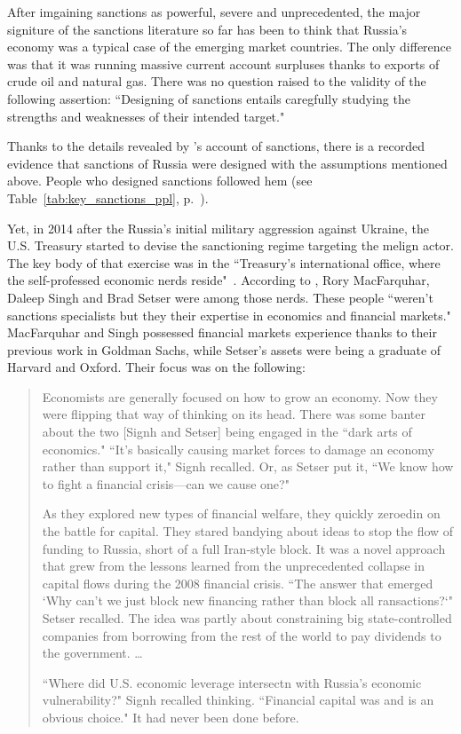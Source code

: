 After imgaining sanctions as powerful, severe and unprecedented, the major signiture of the sanctions literature so far has been to think that Russia's economy was a typical case of the emerging market countries. The only difference was that it was running massive current account surpluses thanks to exports of crude oil and natural gas. There was no question raised to the validity of the following assertion: ``Designing of sanctions entails caregfully studying the strengths and weaknesses of their intended target."~\citep[p.~23]{demarais2022}

Thanks to the details revealed by \cite{baker2024}'s account of sanctions, there is a recorded evidence that sanctions of Russia were designed with the assumptions mentioned above. People who designed sanctions followed hem (see Table~\ref{tab:key_sanctions_ppl}, p.~\pageref{tab:key_sanctions_ppl}). 

Yet, in 2014 after the Russia's initial military aggression against Ukraine, the U.S. Treasury started to devise the sanctioning regime targeting the melign actor. The key body of that exercise was in the ``Treasury's international office, where the self-professed economic nerds reside"~\citep[p.~86]{baker2024}. According to \citeauthor{baker2024}, Rory MacFarquhar, Daleep Singh and Brad Setser were among those nerds. These people ``weren't sanctions specialists but they their expertise in economics and financial markets." MacFarquhar and Singh possessed financial markets experience thanks to their previous work in Goldman Sachs, while Setser's assets were being a graduate of Harvard and Oxford. Their focus was on the following:

\begin{quote}
Economists are generally focused on how to grow an economy. Now they were flipping that way of thinking on its head. There was some banter about the two [Signh and Setser] being engaged in the ``dark arts of economics." ``It's basically causing market forces to damage an economy rather than support it," Signh recalled. Or, as Setser put it, ``We know how to fight a financial crisis---can we cause one?"\par As they explored new types of financial welfare, they quickly zeroedin on the battle for capital. They stared bandying about ideas to stop the flow of funding to Russia, short of a full Iran-style block. It was a novel approach that grew from the lessons learned from the unprecedented collapse in capital flows during the 2008 financial crisis. ``The answer that emerged `Why can't we just block new financing rather than block all ransactions?`" Setser recalled. The idea was partly about constraining big state-controlled companies from borrowing from the rest of the world to pay dividends to the government. \dots\par ``Where did U.S. economic leverage intersectn with Russia's economic vulnerability?" Signh recalled thinking. ``Financial capital was and is an obvious choice." It had never been done before.~\citep[pp.86-87]{baker2024}
\end{quote}

